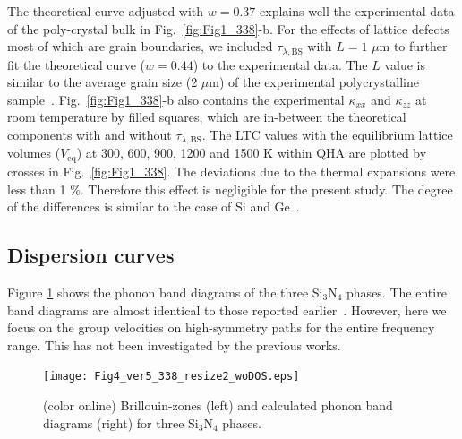 \documentclass[twocolumn,amsmath,amssymb,a4paper,prb,superscriptaddress,floatfix]{revtex4-1}
\begin{document}
The theoretical curve adjusted with $w=0.37$ explains well the experimental
data of the poly-crystal bulk in Fig.~\ref{fig:Fig1_338}-b.  For the effects of
lattice defects most of which are grain boundaries, we included
$\tau_{\lambda,\text{BS}}$ with $L = 1$ $\mu\text{m}$ to further fit the
theoretical curve ($w=0.44$) to the experimental data.  The $L$ value is
similar to the average grain size (2 $\mu\text{m}$) of the experimental
polycrystalline sample~\cite{hirosaki}. 
Fig.~\ref{fig:Fig1_338}-b also contains the experimental $\kappa$$_{xx}$ and
$\kappa$$_{zz}$ at room temperature by filled squares, which are in-between the
theoretical components with and without $\tau_{\lambda,\text{BS}}$.
The LTC values with the equilibrium lattice volumes ($V_\text{eq}$) at 300,
600, 900, 1200 and 1500 K within QHA are plotted by crosses in
Fig.~\ref{fig:Fig1_338}.  The deviations due to the thermal expansions were
less than 1 \%. Therefore this effect is negligible for the present study.  The
degree of the differences is similar to the case of Si and Ge~\cite{ward-ltc}.

\subsection{Dispersion curves}
Figure \ref{fig:Fig4_ver5_338} shows the phonon band diagrams of the three
Si$_3$N$_4$ phases. The entire band diagrams are almost identical to those reported
earlier~\cite{kuwabara,xu}. However, here we focus on the group velocities on
high-symmetry paths for the entire frequency range. This has not been
investigated by the previous works.

\begin{figure}[ht]
 \begin{center}
  \texttt{[image: Fig4\_ver5\_338\_resize2\_woDOS.eps]}
  \caption{(color online) Brillouin-zones (left) and calculated phonon band diagrams (right) for three Si$_3$N$_4$ phases.
  \label{fig:Fig4_ver5_338} }
 \end{center}
\end{figure}
\end{document}

